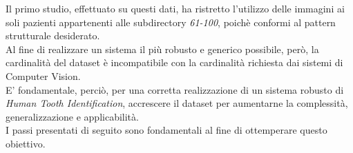 \documentclass[12pt,a4paper,openright,twoside]{book}
\begin{document}
Il primo studio, effettuato su questi dati, ha ristretto l'utilizzo delle immagini ai soli pazienti appartenenti alle subdirectory {\itshape 61-100}, poichè conformi al pattern strutturale desiderato.\\
Al fine di realizzare un sistema il più robusto e generico possibile, però, la cardinalità del dataset è incompatibile con la cardinalità richiesta dai sistemi di Computer Vision.\\
E' fondamentale, perciò, per una corretta realizzazione di un sistema robusto di {\itshape Human Tooth Identification}, accrescere il dataset per aumentarne la complessità, generalizzazione e applicabilità.\\
I passi presentati di seguito sono fondamentali al fine di ottemperare questo obiettivo.

\end{document}

